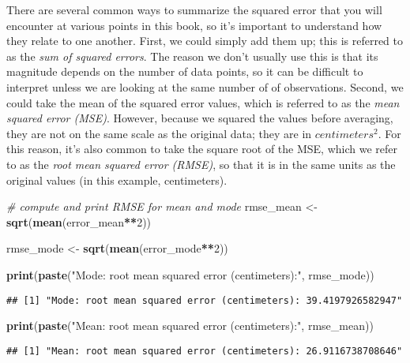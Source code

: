 \documentclass[]{book}
\newenvironment{Shaded}{\begin{snugshade}}{\end{snugshade}}
\newcommand{\KeywordTok}[1]{\textcolor[rgb]{0.13,0.29,0.53}{\textbf{#1}}}
\newcommand{\DecValTok}[1]{\textcolor[rgb]{0.00,0.00,0.81}{#1}}
\newcommand{\StringTok}[1]{\textcolor[rgb]{0.31,0.60,0.02}{#1}}
\newcommand{\CommentTok}[1]{\textcolor[rgb]{0.56,0.35,0.01}{\textit{#1}}}
\newcommand{\OperatorTok}[1]{\textcolor[rgb]{0.81,0.36,0.00}{\textbf{#1}}}
\newcommand{\NormalTok}[1]{#1}
\theoremstyle{definition}
\theoremstyle{definition}
\theoremstyle{definition}
\theoremstyle{remark}
\begin{document}
There are several common ways to summarize the squared error that you
will encounter at various points in this book, so it's important to
understand how they relate to one another. First, we could simply add
them up; this is referred to as the \emph{sum of squared errors}. The
reason we don't usually use this is that its magnitude depends on the
number of data points, so it can be difficult to interpret unless we are
looking at the same number of of observations. Second, we could take the
mean of the squared error values, which is referred to as the \emph{mean
squared error (MSE)}. However, because we squared the values before
averaging, they are not on the same scale as the original data; they are
in \(centimeters^2\). For this reason, it's also common to take the
square root of the MSE, which we refer to as the \emph{root mean squared
error (RMSE)}, so that it is in the same units as the original values
(in this example, centimeters).

\begin{Shaded}
\begin{Highlighting}[]
\CommentTok{# compute and print RMSE for mean and mode}
\NormalTok{rmse_mean <-}\StringTok{ }\KeywordTok{sqrt}\NormalTok{(}\KeywordTok{mean}\NormalTok{(error_mean}\OperatorTok{**}\DecValTok{2}\NormalTok{))}

\NormalTok{rmse_mode <-}\StringTok{ }\KeywordTok{sqrt}\NormalTok{(}\KeywordTok{mean}\NormalTok{(error_mode}\OperatorTok{**}\DecValTok{2}\NormalTok{))}

\KeywordTok{print}\NormalTok{(}\KeywordTok{paste}\NormalTok{(}\StringTok{"Mode: root mean squared error (centimeters):"}\NormalTok{, rmse_mode))}
\end{Highlighting}
\end{Shaded}

\begin{verbatim}
## [1] "Mode: root mean squared error (centimeters): 39.4197926582947"
\end{verbatim}

\begin{Shaded}
\begin{Highlighting}[]
\KeywordTok{print}\NormalTok{(}\KeywordTok{paste}\NormalTok{(}\StringTok{"Mean: root mean squared error (centimeters):"}\NormalTok{, rmse_mean))}
\end{Highlighting}
\end{Shaded}

\begin{verbatim}
## [1] "Mean: root mean squared error (centimeters): 26.9116738708646"
\end{verbatim}
\end{document}
